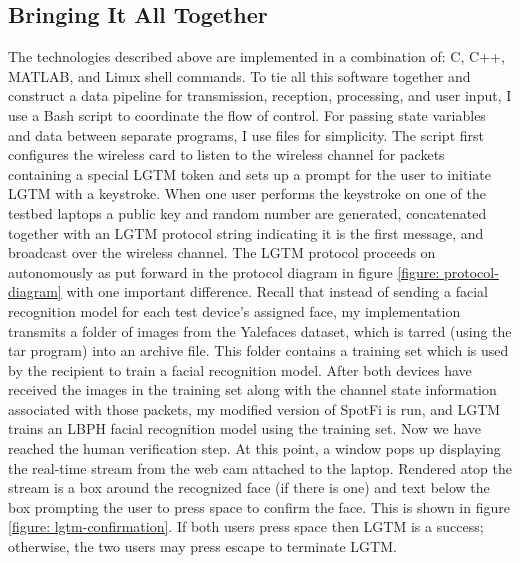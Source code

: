\documentclass[12pt]{report}
\begin{document}
\subsection{Bringing It All Together}
The technologies described above are implemented in a combination of: C, C++, MATLAB, and Linux shell commands. To tie all this software together and construct a data pipeline for transmission, reception, processing, and user input, I use a Bash script to coordinate the flow of control. For passing state variables and data between separate programs, I use files for simplicity. The script first configures the wireless card to listen to the wireless channel for packets containing a special LGTM token and sets up a prompt for the user to initiate LGTM with a keystroke. When one user performs the keystroke on one of the testbed laptops a public key and random number are generated, concatenated together with an LGTM protocol string indicating it is the first message, and broadcast over the wireless channel. The LGTM protocol proceeds on autonomously as put forward in the protocol diagram in figure \ref{figure: protocol-diagram} with one important difference. Recall that instead of sending a facial recognition model for each test device's assigned face, my implementation transmits a folder of images from the Yalefaces dataset, which is tarred (using the tar program) into an archive file. This folder contains a training set which is used by the recipient to train a facial recognition model. After both devices have received the images in the training set along with the channel state information associated with those packets, my modified version of SpotFi is run, and LGTM trains an LBPH facial recognition model using the training set. Now we have reached the human verification step. At this point, a window pops up displaying the real-time stream from the web cam attached to the laptop. Rendered atop the stream is a box around the recognized face (if there is one) and text below the box prompting the user to press space to confirm the face. This is shown in figure \ref{figure: lgtm-confirmation}. If both users press space then LGTM is a success; otherwise, the two users may press escape to terminate LGTM. \par
\end{document}
